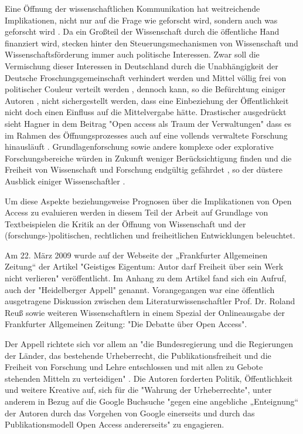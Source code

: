 Eine Öffnung der wissenschaftlichen Kommunikation hat weitreichende Implikationen, nicht nur auf die Frage wie geforscht wird, sondern auch was geforscht wird \cite{suchen}. Da ein Großteil der Wissenschaft durch die öffentliche Hand finanziert wird, stecken hinter den Steuerungsmechanismen von Wissenschaft und Wissenschaftsförderung immer auch politische Interessen. Zwar soll die Vermischung dieser Interessen in Deutschland durch die Unabhängigkeit der Deutsche Froschungsgemeinschaft verhindert werden und Mittel völlig frei von politischer Couleur verteilt werden \cite{suchen}, dennoch kann, so die Befürchtung einiger Autoren \cite{suchen}, nicht sichergestellt werden, dass eine Einbeziehung der Öffentlichkeit nicht doch einen Einfluss auf die Mittelvergabe hätte. Drastischer ausgedrückt sieht Hagner in dem Beitrag "Open access als Traum der Verwaltungen" dass es im Rahmen des Öffnungsprozesses auch auf eine vollends verwaltete Forschung hinausläuft \cite{suchen}. Grundlagenforschung sowie andere komplexe oder explorative Forschungsbereiche würden in Zukunft weniger Berücksichtigung finden und die Freiheit von Wissenschaft und Forschung endgültig gefährdet \cite{suchen}, so der düstere Ausblick einiger Wissenschaftler \cite{suchen} \cite{suchen}. 

Um diese Aspekte beziehungsweise Prognosen über die Implikationen von Open Access zu evaluieren werden in diesem Teil der Arbeit auf Grundlage von Textbeispielen die Kritik an der Öffnung von Wissenschaft und der (forschungs-)politischen, rechtlichen und freiheitlichen Entwicklungen beleuchtet.


Am 22. März 2009 wurde auf der Webseite der „Frankfurter Allgemeinen Zeitung“ der Artikel "Geistiges Eigentum: Autor darf Freiheit über sein Werk nicht verlieren" \cite{faz_heidelberger_apell_2009} veröffentlicht. Im Anhang zu dem Artikel fand sich ein Aufruf, auch der "Heidelberger Appell" genannt. Vorangegangen war eine öffentlich ausgetragene Diskussion zwischen dem Literaturwissenschaftler Prof. Dr. Roland Reuß sowie weiteren Wissenschaftlern in einem Spezial der Onlineausgabe der Frankfurter Allgemeinen Zeitung: "Die Debatte über Open Access".

Der Appell richtete sich vor allem an "die Bundesregierung und die Regierungen der Länder, das bestehende Urheberrecht, die Publikationsfreiheit und die Freiheit von Forschung und Lehre entschlossen und mit allen zu Gebote stehenden Mitteln zu verteidigen" \cite{ITK_2009}. Die Autoren forderten Politik, Öffentlichkeit und weitere Kreative auf, sich für die "Wahrung der Urheberrechte", unter anderem in Bezug auf die Google Buchsuche "gegen eine angebliche „Enteignung“ der Autoren durch das Vorgehen von Google einerseits und durch das Publikationsmodell Open Access andererseits" \cite{WD_bundestag_2009} zu engagieren. 

